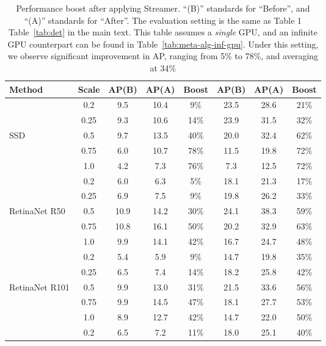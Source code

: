 \begin{table*}[]
\small
\centering
\caption{Performance boost after applying Streamer. ``(B)'' standards for ``Before'', and ``(A)'' standards for ``After''. The evaluation setting is the same as
\ifstandalonesupplement
    Table 1 
\else
    Table~\ref{tab:det}
\fi
in the main text. This table assumes a {\em single} GPU, and an infinite GPU counterpart can be found in Table~\ref{tab:meta-alg-inf-gpu}. Under this setting, we observe significant improvement in AP, ranging from 5\% to 78\%, and averaging at 34\%
}
\label{tab:meta-alg-single-gpu} 
\addtolength{\tabcolsep}{0.2em}
\vspace{-0.5em}
\begin{tabular}{lccccccc}
\toprule
Method & Scale & AP(B) & AP(A) & Boost & AP(B) & AP(A) & Boost \\
\midrule
                   & 0.2  & 9.5  & 10.4 & 9\%  & 23.5 & 28.6 & 21\% \\
                   & 0.25 & 9.3  & 10.6 & 14\% & 23.9 & 31.5 & 32\% \\
SSD                & 0.5  & 9.7  & 13.5 & 40\% & 20.0 & 32.4 & 62\% \\
                   & 0.75 & 6.0  & 10.7 & 78\% & 11.5 & 19.8 & 72\% \\
                   & 1.0  & 4.2  & 7.3  & 76\% & 7.3  & 12.5 & 72\% \\
\midrule
                   & 0.2  & 6.0  & 6.3  & 5\%  & 18.1 & 21.3 & 17\% \\
                   & 0.25 & 6.9  & 7.5  & 9\%  & 19.8 & 26.2 & 33\% \\
RetinaNet R50      & 0.5  & 10.9 & 14.2 & 30\% & 24.1 & 38.3 & 59\% \\
                   & 0.75 & 10.8 & 16.1 & 50\% & 20.2 & 32.9 & 63\% \\
                   & 1.0  & 9.9  & 14.1 & 42\% & 16.7 & 24.7 & 48\% \\
\midrule
                   & 0.2  & 5.4  & 5.9  & 9\%  & 14.7 & 19.8 & 35\% \\
                   & 0.25 & 6.5  & 7.4  & 14\% & 18.2 & 25.8 & 42\% \\
RetinaNet R101     & 0.5  & 9.9  & 13.0 & 31\% & 21.5 & 33.6 & 56\% \\
                   & 0.75 & 9.9  & 14.5 & 47\% & 18.1 & 27.7 & 53\% \\
                   & 1.0  & 8.9  & 12.7 & 42\% & 14.7 & 22.0 & 50\% \\
\midrule
                   & 0.2  & 6.5  & 7.2  & 11\% & 18.0 & 25.1 & 40\% \\

\end{tabular}
\end{table*}
